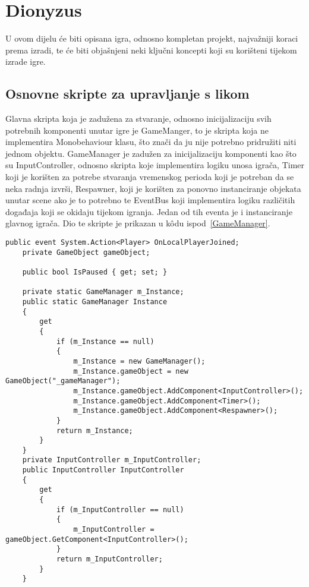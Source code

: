 \section{Dionyzus}
U ovom dijelu će biti opisana igra, odnosno kompletan projekt, najvažniji koraci prema izradi, te će biti objašnjeni neki ključni koncepti koji su korišteni tijekom izrade igre.
\subsection{Osnovne skripte za upravljanje s likom}
Glavna skripta koja je zadužena za stvaranje, odnosno inicijalizaciju svih potrebnih komponenti unutar igre je GameManger, to je skripta koja ne implementira Monobehaviour klasu, što znači da ju nije potrebno pridružiti niti jednom objektu. GameManager je zadužen za inicijalizaciju komponenti kao što su InputController, odnosno skripta koje implementira logiku unosa igrača, Timer koji je korišten za potrebe stvaranja vremenskog perioda koji je potreban da se neka radnja izvrši, Respawner, koji je korišten za ponovno instanciranje objekata unutar scene ako je to potrebno te EventBus koji implementira logiku različitih događaja koji se okidaju tijekom igranja. Jedan od tih eventa je i instanciranje glavnog igrača.
Dio te skripte je prikazan u k\^odu ispod~\ref{GameManager}.
\begin{lstlisting}[caption={Menadžer igre}, label=GameManager]
    public event System.Action<Player> OnLocalPlayerJoined;
    private GameObject gameObject;

    public bool IsPaused { get; set; }

    private static GameManager m_Instance;
    public static GameManager Instance
    {
        get
        {
            if (m_Instance == null)
            {
                m_Instance = new GameManager();
                m_Instance.gameObject = new GameObject("_gameManager");
                m_Instance.gameObject.AddComponent<InputController>();
                m_Instance.gameObject.AddComponent<Timer>();
                m_Instance.gameObject.AddComponent<Respawner>();
            }
            return m_Instance;
        }
    }
    private InputController m_InputController;
    public InputController InputController
    {
        get
        {
            if (m_InputController == null)
            {
                m_InputController = gameObject.GetComponent<InputController>();
            }
            return m_InputController;
        }
    }
\end{lstlisting}

